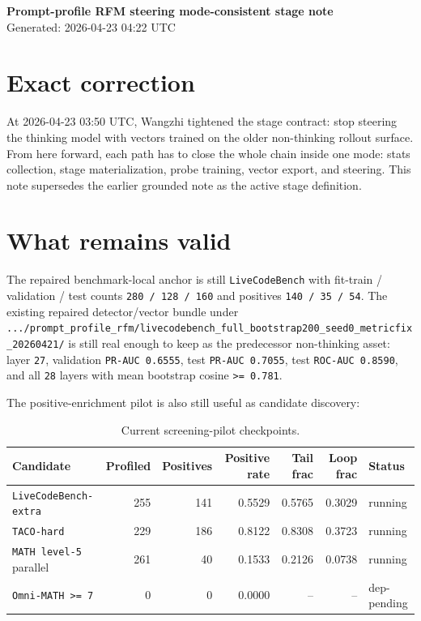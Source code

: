 \documentclass[11pt]{article}
\begin{document}
{\Large \textbf{Prompt-profile RFM steering mode-consistent stage note}}\\
Generated: 2026-04-23 04:22 UTC

\section*{Exact correction}
At 2026-04-23 03:50 UTC, Wangzhi tightened the stage contract: stop steering the thinking model with vectors trained on the older non-thinking rollout surface. From here forward, each path has to close the whole chain inside one mode: stats collection, stage materialization, probe training, vector export, and steering. This note supersedes the earlier grounded note as the active stage definition.

\section*{What remains valid}
The repaired benchmark-local anchor is still \texttt{LiveCodeBench} with fit-train / validation / test counts \texttt{280 / 128 / 160} and positives \texttt{140 / 35 / 54}. The existing repaired detector/vector bundle under \texttt{.../prompt\_profile\_rfm/livecodebench\_full\_bootstrap200\_seed0\_metricfix\_20260421/} is still real enough to keep as the predecessor non-thinking asset: layer \texttt{27}, validation \texttt{PR-AUC 0.6555}, test \texttt{PR-AUC 0.7055}, test \texttt{ROC-AUC 0.8590}, and all \texttt{28} layers with mean bootstrap cosine \texttt{>= 0.781}.

The positive-enrichment pilot is also still useful as candidate discovery:

\begin{table}[h]
\centering
\begin{tabularx}{\textwidth}{>{\raggedright\arraybackslash}p{}rrrrr>{\raggedright\arraybackslash}p{}}
\toprule
Candidate & Profiled & Positives & Positive rate & Tail frac & Loop frac & Status \\
\midrule
\texttt{LiveCodeBench-extra} & 255 & 141 & 0.5529 & 0.5765 & 0.3029 & running \\
\texttt{TACO-hard} & 229 & 186 & 0.8122 & 0.8308 & 0.3723 & running \\
\texttt{MATH level-5} parallel & 261 & 40 & 0.1533 & 0.2126 & 0.0738 & running \\
\texttt{Omni-MATH >= 7} & 0 & 0 & 0.0000 & -- & -- & dep-pending \\
\bottomrule
\end{tabularx}
\caption{Current screening-pilot checkpoints.}
\end{table}
\end{document}
